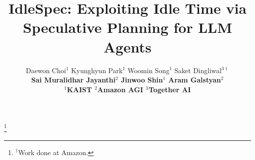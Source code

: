\documentclass{article}
\title{IdleSpec: Exploiting Idle Time via Speculative Planning for LLM Agents}
\author{%
  Daewon Choi$^{1}$ \quad Kyunghyun Park$^{1}$ \quad Woomin Song$^{1}$ \quad Saket Dingliwal$^{3\dagger}$ \\
  \bfseries Sai Muralidhar Jayanthi$^{2}$ \quad Jinwoo Shin$^{1}$ \quad Aram Galstyan$^{2}$ \\[4pt]
  \mdseries $^{1}$KAIST \qquad $^{2}$Amazon AGI \qquad $^{3}$Together AI
}
\theoremstyle{plain}
\theoremstyle{definition}
\theoremstyle{remark}
\newcommand\blfootnote[1]{%
  \begingroup
  \renewcommand\thefootnote{}\footnote{#1}%
  \addtocounter{footnote}{-1}%
  \endgroup
}
\begin{document}
\maketitle
\blfootnote{\ignorespaces$^{\dagger}$Work done at Amazon.}











\appendix

\end{document}

